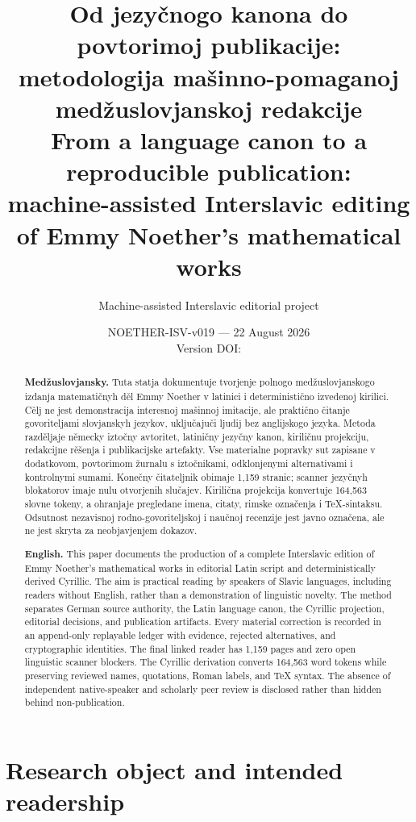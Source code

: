 \documentclass[11pt]{article}
\title{\sffamily\bfseries\color{NoetherBlue}
Od jezyčnogo kanona do povtorimoj publikacije:\\
metodologija mašinno-pomaganoj medžuslovjanskoj redakcije\\[0.6em]
\large From a language canon to a reproducible publication:\\
machine-assisted Interslavic editing of Emmy Noether's mathematical works}
\author{Machine-assisted Interslavic editorial project}
\date{NOETHER-ISV-v019 --- 22 August 2026\\
Version DOI: \doiurl{10.5281/zenodo.22050935}}
\begin{document}
\maketitle

\begin{abstract}
\noindent\textbf{Medžuslovjansky.}
Tuta statja dokumentuje tvorjenje polnogo medžuslovjanskogo izdanja matematičnyh děl Emmy Noether v latinici i deterministično izvedenoj kirilici. Cělj ne jest demonstracija interesnoj mašinnoj imitacije, ale praktično čitanje govoriteljami slovjanskyh jezykov, uključajuči ljudij bez anglijskogo jezyka. Metoda razděljaje německy iztočny avtoritet, latiničny jezyčny kanon, kiriličnu projekciju, redakcijne rěšenja i publikacijske artefakty. Vse materialne popravky sut zapisane v dodatkovom, povtorimom žurnalu s iztočnikami, odklonjenymi alternativami i kontrolnymi sumami. Konečny čitateljnik obimaje 1,159 stranic; scanner jezyčnyh blokatorov imaje nulu otvorjenih slučajev. Kirilična projekcija konvertuje 164,563 slovne tokeny, a ohranjaje pregledane imena, citaty, rimske označenja i TeX-sintaksu. Odsutnost nezavisnoj rodno-govoriteljskoj i naučnoj recenzije jest javno označena, ale ne jest skryta za neobjavjenjem dokazov.

\medskip
\noindent\textbf{English.}
This paper documents the production of a complete Interslavic edition of Emmy Noether's mathematical works in editorial Latin script and deterministically derived Cyrillic. The aim is practical reading by speakers of Slavic languages, including readers without English, rather than a demonstration of linguistic novelty. The method separates German source authority, the Latin language canon, the Cyrillic projection, editorial decisions, and publication artifacts. Every material correction is recorded in an append-only replayable ledger with evidence, rejected alternatives, and cryptographic identities. The final linked reader has 1,159 pages and zero open linguistic scanner blockers. The Cyrillic derivation converts 164,563 word tokens while preserving reviewed names, quotations, Roman labels, and TeX syntax. The absence of independent native-speaker and scholarly peer review is disclosed rather than hidden behind non-publication.
\end{abstract}

\section{Research object and intended readership}
\end{document}
